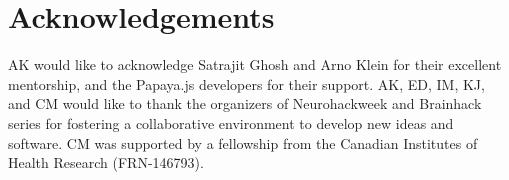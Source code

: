 \section{Acknowledgements}
AK would like to acknowledge Satrajit Ghosh and Arno Klein for their excellent mentorship, and the Papaya.js developers for their support. AK, ED, IM, KJ, and CM would like to thank the organizers of Neurohackweek and Brainhack series for fostering a collaborative environment to develop new ideas and software. CM was supported by a fellowship from the Canadian Institutes of Health Research (FRN-146793). 

